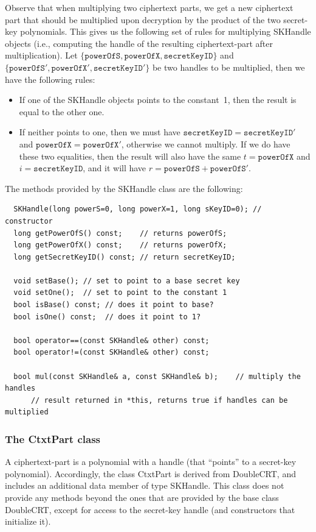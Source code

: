 \documentclass[14pt]{extarticle}
\def\DoubleCRT{\textsf{DoubleCRT}}
\def\SKHandle{\textsf{SKHandle}}
\def\CtxtPart{\textsf{CtxtPart}}
\begin{document}
Observe that when multiplying two ciphertext parts, we get a new
ciphertext part that should be multiplied upon decryption by the
product of the two secret-key polynomials. This gives us the following
set of rules for multiplying {\SKHandle} objects (i.e., computing the
handle of the resulting ciphertext-part after multiplication). Let
$\{\mathtt{powerOfS},\mathtt{powerOfX},\mathtt{secretKeyID}\}$ and
$\{\mathtt{powerOfS}',\mathtt{powerOfX}',\mathtt{secretKeyID}'\}$ be
two handles to be multiplied, then we have the following rules:
\begin{itemize}
\item If one of the {\SKHandle} objects points to the constant~1, then
the result is equal to the other one.

\item If neither points to one, then we must have
$\mathtt{secretKeyID}=\mathtt{secretKeyID}'$ and $\mathtt{powerOfX}=
\mathtt{powerOfX}'$, otherwise we cannot multiply. If we do have
these two equalities, then the result will also have the same
$t=\mathtt{powerOfX}$ and $i=\mathtt{secretKeyID}$, and it will
have $r=\mathtt{powerOfS}+\mathtt{powerOfS}'$.
\end{itemize} 
The methods provided by the {\SKHandle} class are the following:
\begin{verbatim}
  SKHandle(long powerS=0, long powerX=1, long sKeyID=0); // constructor
  long getPowerOfS() const;    // returns powerOfS;
  long getPowerOfX() const;    // returns powerOfX;
  long getSecretKeyID() const; // return secretKeyID;

  void setBase(); // set to point to a base secret key
  void setOne();  // set to point to the constant 1
  bool isBase() const; // does it point to base?
  bool isOne() const;  // does it point to 1?

  bool operator==(const SKHandle& other) const;
  bool operator!=(const SKHandle& other) const;

  bool mul(const SKHandle& a, const SKHandle& b);    // multiply the handles
      // result returned in *this, returns true if handles can be multiplied
\end{verbatim}

\subsubsection{The {\CtxtPart} class}\label{sec:CtxtPart}
A ciphertext-part is a polynomial with a handle (that
``points'' to a secret-key polynomial). Accordingly, the class
{\CtxtPart} is derived from {\DoubleCRT}, and includes an additional
data member of type {\SKHandle}. This class does not provide any
methods beyond the ones that are provided by the base class
{\DoubleCRT}, except for access to the secret-key handle (and
constructors that initialize it).
\end{document}
